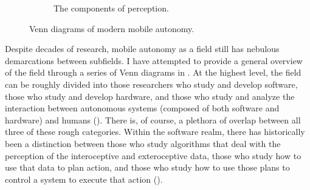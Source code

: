 \begin{figure}
\begin{subfigure}[b]{0.3\textwidth}
        \caption{The components of perception.}
         \label{fig:intro_perception_venn}
 \end{subfigure}
        \caption{Venn diagrams of modern mobile autonomy.}
        \label{fig:intro_three_venn}
\end{figure}

 
 Despite decades of research, mobile autonomy as a field still has nebulous demarcations between subfields. I have attempted to provide a general overview of the field through a series of Venn diagrams in .  At the highest level, the field can be roughly divided into those researchers who study and develop software, those who study and develop hardware, and those who study and analyze the interaction between autonomous systems (composed of both software and hardware) and humans (). There is, of course, a plethora of overlap between all three of these rough categories. Within the software realm, there has historically been a distinction between those who study algorithms that deal with the perception of the interoceptive and exteroceptive data, those who study how to use that data to plan action, and those who study how to use those plans to control a system to execute that action (). 
 
 
